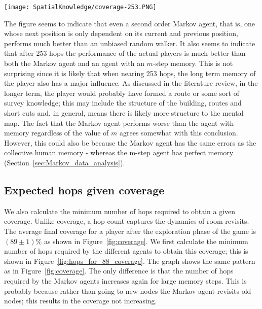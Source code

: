 \begin{figure*}[tb]
    \begin{center}
        \texttt{[image: SpatialKnowledge/coverage-253.PNG]}
    \end{center}
    \caption[Expected coverage after 253 hops]{This figure shows a standard error plot of the average coverage after 253 hops as a function of memory size. The low values of standard error on the agent paths are because these calculations are calculated over several thousand paths that are required for the radius of gyration to stabilize. A value of 253 hops was taken because this was the average number of hops taken by a player.}
    \label{fig:coverage}
\end{figure*}


The figure seems to indicate that even a second order Markov agent, that is, one whose next position is only dependent on its current and previous position, performs much better than an unbiased random walker. It also seems to indicate that after 253 hops the performance of the actual players is much better than both the Markov agent and an agent with an $m$-step memory. This is not surprising since it is likely that when nearing 253 hops, the long term memory of the player also has a major influence. As discussed in the literature review, in the longer term, the player would probably have formed a route or some sort of survey knowledge; this may include the structure of the building, routes and short cuts and, in general, means there is likely more structure to the mental map. The fact that the Markov agent performs worse than the agent with memory regardless of the value of $m$ agrees somewhat with this conclusion. However, this could also be because the Markov agent has the same errors as the collective human memory - whereas the m-step agent has perfect memory (Section~\ref{sec:Markov_data_analysis}).



\subsection{Expected hops given coverage} %
\label{sec:calculation_5_expected_hops_given_coverage}

We also calculate the minimum number of hops required to obtain a given coverage. Unlike coverage, a hop count captures the dynamics of room revisits. The average final coverage for a player after the exploration phase of the game is $(89 \pm 1) \%$ as shown in Figure~\ref{fig:coverage}. We first calculate the minimum number of hops required by the different agents to obtain this coverage; this is shown in Figure~\ref{fig:hops_for_88_coverage}. The graph shows the same pattern as in Figure~\ref{fig:coverage}. The only difference is that the number of hops required by the Markov agents increases again for large memory steps. This is probably because rather than going to new nodes the Markov agent revisits old nodes; this results in the coverage not increasing.

